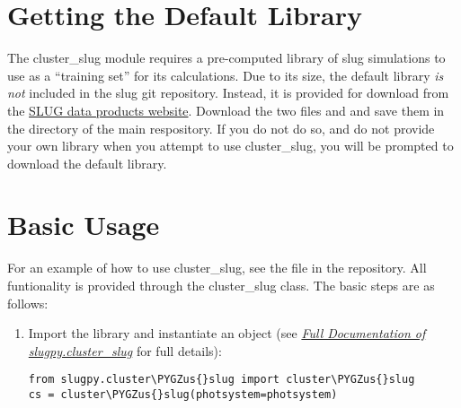 \documentclass[letterpaper,10pt,english]{sphinxmanual}
\def\PYGZus{\char`\_}
\begin{document}
\section{Getting the Default Library}
\label{cluster_slug:getting-the-default-library}
The cluster\_slug module requires a pre-computed library of slug simulations to use as a ``training set'' for its calculations. Due to its size, the default library \emph{is not} included in the slug git repository. Instead, it is provided for download from the \href{http://www.slugsps.com/data}{SLUG data products website}. Download the two files  and  and save them in the  directory of the main respository. If you do not do so, and do not provide your own library when you attempt to use cluster\_slug, you will be prompted to download the default library.


\section{Basic Usage}
\label{cluster_slug:basic-usage}
For an example of how to use cluster\_slug, see the file  in the repository. All funtionality is provided through the cluster\_slug class. The basic steps are as follows:
\begin{enumerate}
\item {} 
Import the library and instantiate an  object (see {\hyperref[cluster_slug:ssec-cluster-slug-full]{\emph{Full Documentation of slugpy.cluster\_slug}}} for full details):

\begin{Verbatim}[commandchars=\\\{\}]
from slugpy.cluster\PYGZus{}slug import cluster\PYGZus{}slug
cs = cluster\PYGZus{}slug(photsystem=photsystem)
\end{Verbatim}

\end{enumerate}
\end{document}
